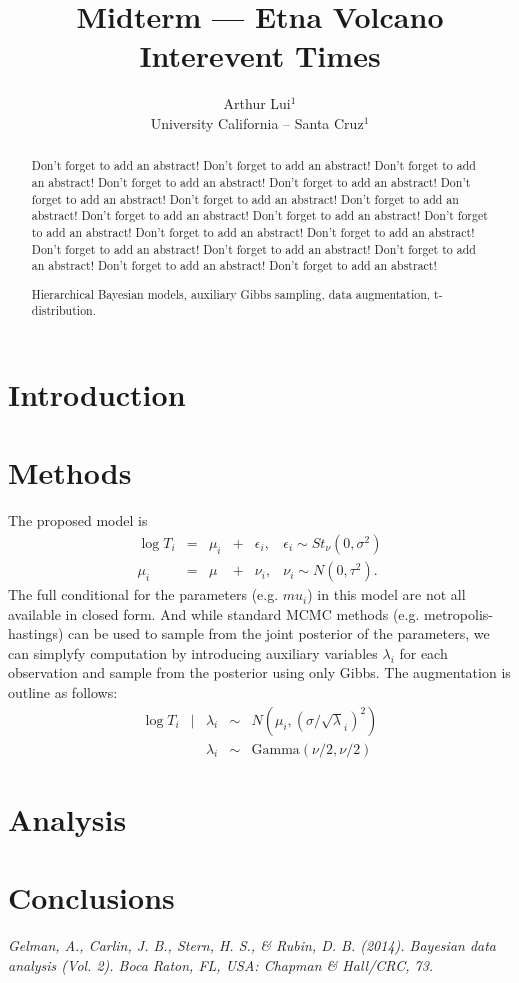 \documentclass{../../tex_template/asaproc}
\title{Midterm --- Etna Volcano Interevent Times}
\author{
  Arthur Lui$^1$\\
  University California -- Santa Cruz$^1$\\
}
\begin{document}
\maketitle
\begin{abstract}
Don't forget to add an abstract!  Don't forget to add an abstract!  Don't forget to add an abstract!
Don't forget to add an abstract!  Don't forget to add an abstract!  Don't forget to add an abstract!
Don't forget to add an abstract!  Don't forget to add an abstract!  Don't forget to add an abstract!
Don't forget to add an abstract!  Don't forget to add an abstract!  Don't forget to add an abstract!
Don't forget to add an abstract!  Don't forget to add an abstract!  Don't forget to add an abstract!
Don't forget to add an abstract!  Don't forget to add an abstract!  Don't forget to add an abstract!
\begin{keywords}
Hierarchical Bayesian models, auxiliary Gibbs sampling, data augmentation, t-distribution.
\end{keywords}
\end{abstract}

\section{Introduction}

\section{Methods}
The proposed model is
$$
\begin{array}{rclcll}
  \log T_i &=& \mu_i &+&\epsilon_i, & \epsilon_i \sim St_\nu(0,\sigma^2)\\
  \mu_i &=& \mu &+& \nu_i, & \nu_i \sim N(0,\tau^2).
\end{array}
$$
The full conditional for the parameters (e.g. $mu_i$) in this model are not all
available in closed form. And while standard MCMC methods (e.g.
metropolis-hastings) can be used to sample from the joint posterior of the
parameters, we can simplyfy computation by introducing auxiliary variables
$\lambda_i$ for each observation and sample from the posterior using only Gibbs.
The augmentation is outline as follows:
$$
\begin{array}{rclcl}
  \log T_i &|& \lambda_i &\sim& N(\mu_i,(\sigma / \sqrt\lambda_i)^2) \\
           & & \lambda_i &\sim& \text{Gamma}(\nu/2,\nu/2)
\end{array}
$$
\section{Analysis}
\section{Conclusions}

\begin{references}
{\footnotesize
\itemsep=3pt

\item {\em Gelman, A., Carlin, J. B., Stern, H. S., \& Rubin, D. B. (2014). Bayesian data analysis (Vol. 2). Boca Raton, FL, USA: Chapman \& Hall/CRC, 73.}

}
\end{references}
\end{document}
